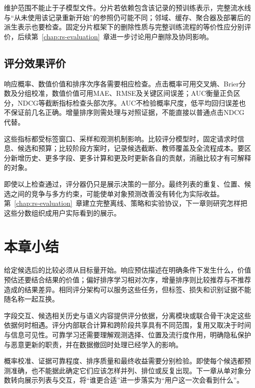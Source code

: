 维护范围不能止于子模型文件。分片若依赖包含该记录的预训练表示，完整流水线与“从未使用该记录重新开始”的参照仍可能不同；邻域、缓存、聚合器及部署后的派生表示也要检查。固定分片框架下的删除性质与完整训练流程的等价性应分别评价，后续第~\ref{chap:rs-evaluation}~章进一步讨论用户删除及协同影响。

\subsection{评分效果评价}
\label{sec:rs-scoring-evaluation}

响应概率、数值价值和排序次序各需要相应检查。点击概率可用交叉熵、Brier分数及分组校准，数值价值可用MAE、RMSE及关键区间误差；AUC衡量正负区分，NDCG等截断指标检查头部次序。AUC不检验概率尺度，低平均回归误差也不保证前几名正确。增量排序则需处理与对照证据，不能直接以普通点击NDCG代替。

这些指标都受标签窗口、采样和观测机制影响。比较评分模型时，固定请求时信息、候选和预算；比较阶段方案时，记录候选截断、教师覆盖及全流程成本。要区分新增历史、更多字段、更多计算和更及时更新各自的贡献，消融比较才有可解释的对象。

即使以上检查通过，评分器仍只是展示决策的一部分。最终列表的重复、位置、候选之间的竞争与多方约束，可能使单对象预测改善没有转化为实际收益。第~\ref{chap:rs-evaluation}~章建立完整离线、策略和实验协议，下一章则研究怎样把这些分数组织成用户实际看到的展示。

\section{本章小结}
\label{sec:rs-ranking-summary}

给定候选后的比较必须从目标量开始。响应预估描述在明确条件下发生什么，价值预估还要结合结果的价值；偏好排序学习相对次序，增量排序则比较推荐与不推荐造成的结果差异。相同评分架构可以服务这些任务，但标签、损失和识别证据不能随名称一起互换。

字段交互、候选相关历史与语义内容提供评分依据，分离模块或联合骨干决定这些依据何时相遇。评分内部联合计算和跨阶段共享具有不同范围，复用又取决于时间与信息可见性。可靠学习还需要理解观测选择、位置及流行度作用，明确隐私保护与恶意更新的职责，并在数据撤回时处理已经学入的影响。

概率校准、证据可靠程度、排序质量和最终收益需要分别检验。即使每个候选都预测准确，也不能据此确定它们应该怎样并列、排位或反复出现。下一章从单对象分数转向展示列表与交互，将“谁更合适”进一步落实为“用户这一次会看到什么”。
